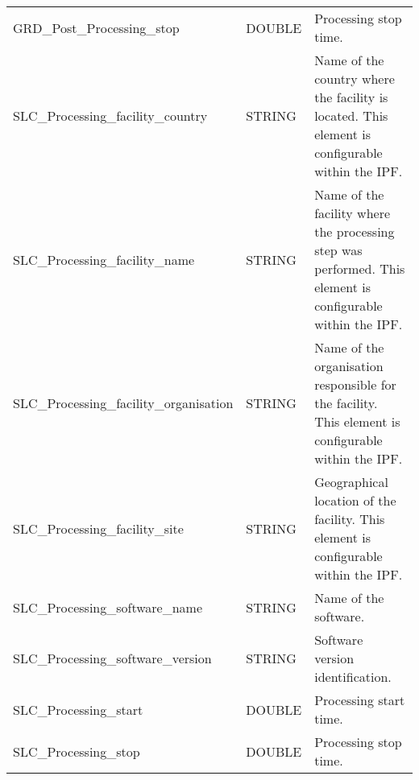 \documentclass[lettersize,journal]{IEEEtran}
\begin{document}
\begin{table*}[h]
{\begin{tabular}{llp{12cm}}
GRD\_Post\_Processing\_stop                      & DOUBLE                            & Processing stop time.                                                                                                                                                   \\
SLC\_Processing\_facility\_country               & STRING                            & Name of the country where the facility is located. This element is configurable within the IPF.                                                                         \\
SLC\_Processing\_facility\_name                  & STRING                            & Name of the facility where the processing step was performed. This element is configurable within the IPF.                                                              \\
SLC\_Processing\_facility\_organisation          & STRING                            & Name of the organisation responsible for the facility. This element is configurable within the IPF.                                                                     \\
SLC\_Processing\_facility\_site                  & STRING                            & Geographical location of the facility. This element is configurable within the IPF.                                                                                     \\
SLC\_Processing\_software\_name                  & STRING                            & Name of the software.                                                                                                                                                   \\
SLC\_Processing\_software\_version               & STRING                            & Software version identification.                                                                                                                                        \\
SLC\_Processing\_start                           & DOUBLE                            & Processing start time.                                                                                                                                                  \\
SLC\_Processing\_stop                            & DOUBLE                            & Processing stop time.                                                                                                                                                   \\

\end{tabular}}
\end{table*}
\end{document}
